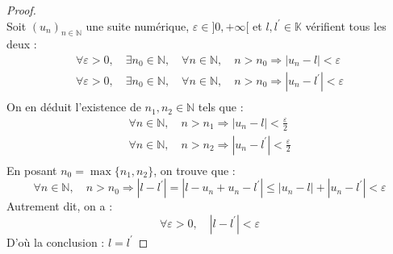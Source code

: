     \begin{proof}\ \\
        Soit \((u_n)_{n\in\mathbb{N}}\) une suite numérique, \(\varepsilon \in ]0, +\infty[ \) et \(l, l^{\prime} \in \mathbb{K}\) vérifient tous les deux :
        \[
            \begin{array}{l}
                \forall \varepsilon > 0, \quad \exists n_0 \in \mathbb{N}, \quad \forall n \in \mathbb{N}, \quad n > n_0 \Rightarrow |u_n - l| < \varepsilon\\
                \forall \varepsilon > 0, \quad \exists n_0 \in \mathbb{N}, \quad \forall n \in \mathbb{N}, \quad n > n_0 \Rightarrow |u_n - l^{\prime}| < \varepsilon\\
            \end{array}
        \]
        On en déduit l'existence de \(n_1, n_2 \in \mathbb{N}\) tels que :
        \[
            \begin{array}{l}
                \forall n \in \mathbb{N},\quad n > n_1 \Rightarrow |u_n - l| < \frac{\varepsilon}{2}\\
                \forall n \in \mathbb{N},\quad n > n_2 \Rightarrow |u_n - l^{\prime}| < \frac{\varepsilon}{2}\\
            \end{array}    
        \]
        En posant \(n_0 = \max{\{n_1, n_2\}}\), on trouve que :
        \[
            \forall n \in \mathbb{N},\quad n > n_0 \Rightarrow |l - l^{\prime}| = |l - u_n + u_n - l^{\prime}| \le |u_n - l| + |u_n - l^{\prime}| < \varepsilon
        \]
        Autrement dit, on a :
        \[
            \forall \varepsilon > 0, \quad |l - l^{\prime}| < \varepsilon 
        \]
        D'où la conclusion : \(l = l^{\prime}\)
    \end{proof}